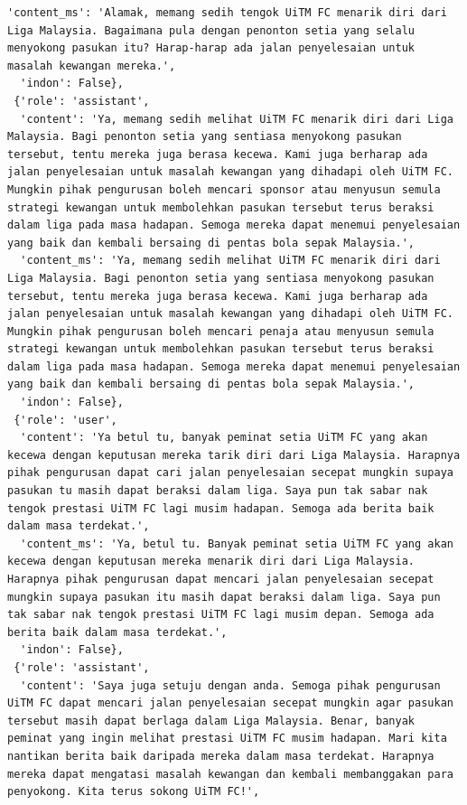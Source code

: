 \documentclass[preprint]{article}
\begin{document}
\begin{lstlisting}[breaklines=true]
  'content_ms': 'Alamak, memang sedih tengok UiTM FC menarik diri dari Liga Malaysia. Bagaimana pula dengan penonton setia yang selalu menyokong pasukan itu? Harap-harap ada jalan penyelesaian untuk masalah kewangan mereka.',
  'indon': False},
 {'role': 'assistant',
  'content': 'Ya, memang sedih melihat UiTM FC menarik diri dari Liga Malaysia. Bagi penonton setia yang sentiasa menyokong pasukan tersebut, tentu mereka juga berasa kecewa. Kami juga berharap ada jalan penyelesaian untuk masalah kewangan yang dihadapi oleh UiTM FC. Mungkin pihak pengurusan boleh mencari sponsor atau menyusun semula strategi kewangan untuk membolehkan pasukan tersebut terus beraksi dalam liga pada masa hadapan. Semoga mereka dapat menemui penyelesaian yang baik dan kembali bersaing di pentas bola sepak Malaysia.',
  'content_ms': 'Ya, memang sedih melihat UiTM FC menarik diri dari Liga Malaysia. Bagi penonton setia yang sentiasa menyokong pasukan tersebut, tentu mereka juga berasa kecewa. Kami juga berharap ada jalan penyelesaian untuk masalah kewangan yang dihadapi oleh UiTM FC. Mungkin pihak pengurusan boleh mencari penaja atau menyusun semula strategi kewangan untuk membolehkan pasukan tersebut terus beraksi dalam liga pada masa hadapan. Semoga mereka dapat menemui penyelesaian yang baik dan kembali bersaing di pentas bola sepak Malaysia.',
  'indon': False},
 {'role': 'user',
  'content': 'Ya betul tu, banyak peminat setia UiTM FC yang akan kecewa dengan keputusan mereka tarik diri dari Liga Malaysia. Harapnya pihak pengurusan dapat cari jalan penyelesaian secepat mungkin supaya pasukan tu masih dapat beraksi dalam liga. Saya pun tak sabar nak tengok prestasi UiTM FC lagi musim hadapan. Semoga ada berita baik dalam masa terdekat.',
  'content_ms': 'Ya, betul tu. Banyak peminat setia UiTM FC yang akan kecewa dengan keputusan mereka menarik diri dari Liga Malaysia. Harapnya pihak pengurusan dapat mencari jalan penyelesaian secepat mungkin supaya pasukan itu masih dapat beraksi dalam liga. Saya pun tak sabar nak tengok prestasi UiTM FC lagi musim depan. Semoga ada berita baik dalam masa terdekat.',
  'indon': False},
 {'role': 'assistant',
  'content': 'Saya juga setuju dengan anda. Semoga pihak pengurusan UiTM FC dapat mencari jalan penyelesaian secepat mungkin agar pasukan tersebut masih dapat berlaga dalam Liga Malaysia. Benar, banyak peminat yang ingin melihat prestasi UiTM FC musim hadapan. Mari kita nantikan berita baik daripada mereka dalam masa terdekat. Harapnya mereka dapat mengatasi masalah kewangan dan kembali membanggakan para penyokong. Kita terus sokong UiTM FC!',

\end{lstlisting}
\end{document}
